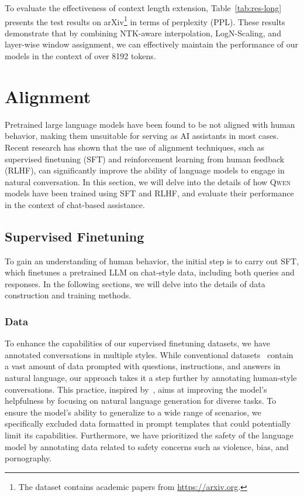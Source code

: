To evaluate the effectiveness of context length extension, Table~\ref{tab:res-long} presents the test results on arXiv\footnote{The dataset contains academic papers from \url{https://arxiv.org}.} in terms of perplexity (PPL). These results demonstrate that by combining NTK-aware interpolation, LogN-Scaling, and layer-wise window assignment, we can effectively maintain the performance of our models in the context of over \num{8192} tokens. 

\section{Alignment}
\label{sec:alignment}

Pretrained large language models have been found to be not aligned with human behavior, making them unsuitable for serving as AI assistants in most cases. Recent research has shown that the use of alignment techniques, such as supervised finetuning (SFT) and reinforcement learning from human feedback (RLHF), can significantly improve the ability of language models to engage in natural conversation. In this section, we will delve into the details of how \textsc{Qwen} models have been trained using SFT and RLHF, and evaluate their performance in the context of chat-based assistance.

\subsection{Supervised Finetuning} To gain an understanding of human behavior, the initial step is to carry out SFT, which finetunes a pretrained LLM on chat-style data, including both queries and responses. In the following sections, we will delve into the details of data construction and training methods.

\subsubsection{Data}

To enhance the capabilities of our supervised finetuning datasets, we have annotated conversations in multiple styles. While conventional datasets~\citep{flan} contain a vast amount of data prompted with questions, instructions, and answers in natural language, our approach takes it a step further by annotating human-style conversations. This practice, inspired by~\citet{instructgpt}, aims at improving the model's helpfulness by focusing on natural language generation for diverse tasks. To ensure the model's ability to generalize to a wide range of scenarios, we specifically excluded data formatted in prompt templates that could potentially limit its capabilities. Furthermore, we have prioritized the safety of the language model by annotating data related to safety concerns such as violence, bias, and pornography. 

